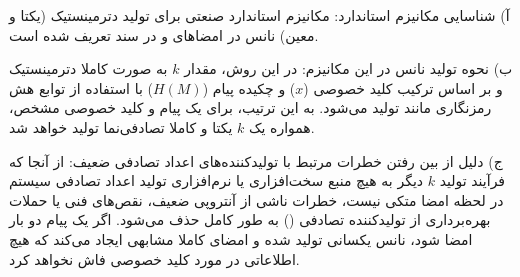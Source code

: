 
{آ) شناسایی مکانیزم استاندارد:}
مکانیزم استاندارد صنعتی برای تولید دترمینستیک (یکتا و معین) نانس در امضاهای  و  در سند \textbf{} تعریف شده است.

{ب) نحوه تولید نانس در این مکانیزم:}
در این روش، مقدار $k$ به صورت کاملا دترمینستیک و بر اساس ترکیب کلید خصوصی ($x$) و چکیده پیام ($H(M)$) با استفاده از توابع هش رمزنگاری مانند  تولید می‌شود. به این ترتیب، برای یک پیام و کلید خصوصی مشخص، همواره یک $k$ یکتا و کاملا تصادفی‌نما تولید خواهد شد.

{ج) دلیل از بین رفتن خطرات مرتبط با تولیدکننده‌های اعداد تصادفی ضعیف:}
از آنجا که فرآیند تولید $k$ دیگر به هیچ منبع سخت‌افزاری یا نرم‌افزاری تولید اعداد تصادفی سیستم در لحظه امضا متکی نیست، خطرات ناشی از آنتروپی ضعیف، نقص‌های فنی یا حملات بهره‌برداری از تولیدکننده تصادفی () به طور کامل حذف می‌شود. اگر یک پیام دو بار امضا شود، نانس یکسانی تولید شده و امضای کاملا مشابهی ایجاد می‌کند که هیچ اطلاعاتی در مورد کلید خصوصی فاش نخواهد کرد.